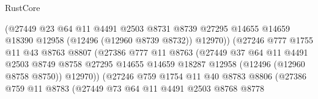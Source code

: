 \begin{lexlean}{RustCore}
\begin{coremodule}
                                  (@27449
                                    @23
                                    @64
                                    @11
                                    @4491
                                    @2503
                                    @8731
                                    @8739
                                    @27295
                                    @14655
                                    @14659
                                    @18390
                                    @12958
                                    (@12496 (@12960 @8739 @8732))
                                    @12970))
                                (@27246
                                  @777
                                  @1755
                                  @11
                                  @43
                                  @8763
                                  @8807
                                  (@27386
                                    @777
                                    @11
                                    @8763
                                    (@27449
                                      @37
                                      @64
                                      @11
                                      @4491
                                      @2503
                                      @8749
                                      @8758
                                      @27295
                                      @14655
                                      @14659
                                      @18287
                                      @12958
                                      (@12496 (@12960 @8758 @8750))
                                      @12970))
                                  (@27246
                                    @759
                                    @1754
                                    @11
                                    @40
                                    @8783
                                    @8806
                                    (@27386
                                      @759
                                      @11
                                      @8783
                                      (@27449
                                        @73
                                        @64
                                        @11
                                        @4491
                                        @2503
                                        @8768
                                        @8778

\end{coremodule}
\end{lexlean}
